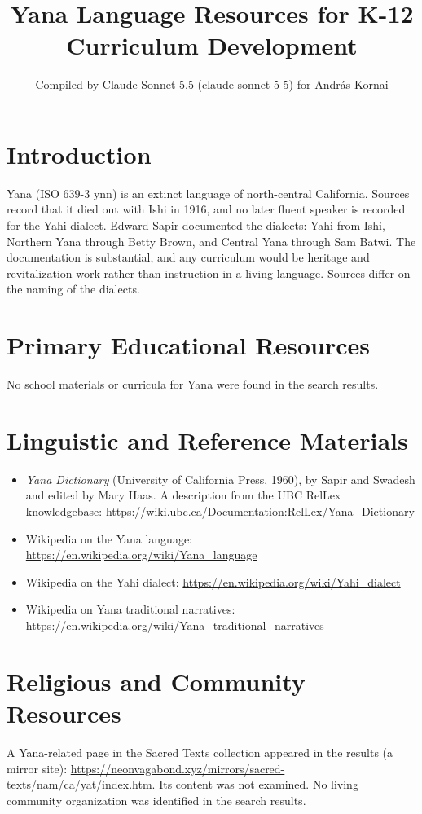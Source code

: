 \documentclass[12pt]{article}
\title{Yana Language Resources for K-12 Curriculum Development}
\author{Compiled by Claude Sonnet 5.5 (claude-sonnet-5-5) for Andr\'as Kornai}
\date{}
\begin{document}
\maketitle

\section{Introduction}
Yana (ISO 639-3 ynn) is an extinct language of north-central California. Sources record that it died out with Ishi in 1916, and no later fluent speaker is recorded for the Yahi dialect. Edward Sapir documented the dialects: Yahi from Ishi, Northern Yana through Betty Brown, and Central Yana through Sam Batwi. The documentation is substantial, and any curriculum would be heritage and revitalization work rather than instruction in a living language. Sources differ on the naming of the dialects.

\section{Primary Educational Resources}
No school materials or curricula for Yana were found in the search results.

\section{Linguistic and Reference Materials}
\begin{itemize}
\item \textit{Yana Dictionary} (University of California Press, 1960), by Sapir and Swadesh and edited by Mary Haas. A description from the UBC RelLex knowledgebase: \url{https://wiki.ubc.ca/Documentation:RelLex/Yana_Dictionary}
\item Wikipedia on the Yana language: \url{https://en.wikipedia.org/wiki/Yana_language}
\item Wikipedia on the Yahi dialect: \url{https://en.wikipedia.org/wiki/Yahi_dialect}
\item Wikipedia on Yana traditional narratives: \url{https://en.wikipedia.org/wiki/Yana_traditional_narratives}
\end{itemize}

\section{Religious and Community Resources}
A Yana-related page in the Sacred Texts collection appeared in the results (a mirror site): \url{https://neonvagabond.xyz/mirrors/sacred-texts/nam/ca/yat/index.htm}. Its content was not examined. No living community organization was identified in the search results.
\end{document}
